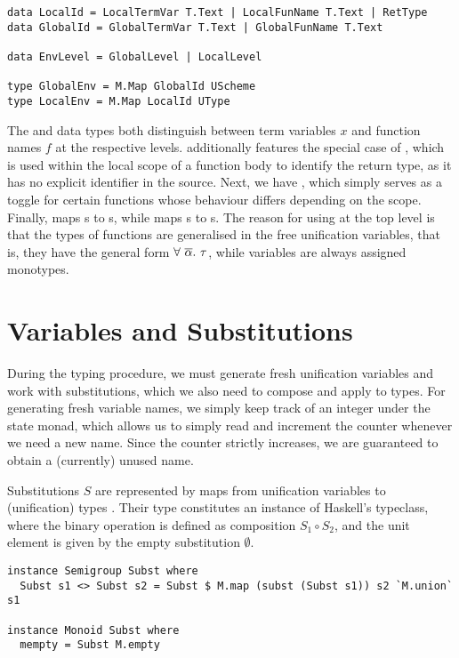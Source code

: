 \begin{verbatim}
data LocalId = LocalTermVar T.Text | LocalFunName T.Text | RetType
data GlobalId = GlobalTermVar T.Text | GlobalFunName T.Text

data EnvLevel = GlobalLevel | LocalLevel

type GlobalEnv = M.Map GlobalId UScheme
type LocalEnv = M.Map LocalId UType
\end{verbatim}

The  and  data types both distinguish between
term variables $x$ and function names $f$ at the respective levels.
 additionally features the special case of ,
which is used within the local scope of a function body to identify the return
type, as it has no explicit identifier in the source.
Next, we have , which simply serves as a toggle for certain
functions whose behaviour differs depending on the scope.
Finally,  maps s to s,
while  maps s to s.
The reason for using  at the top level is that the types of
functions are generalised in the free unification variables, that is, they have
the general form $\forall\ \set{\alpha}.\ \tau$, while variables are always
assigned monotypes.


\section{Variables and Substitutions}

During the typing procedure, we must generate fresh unification variables and
work with substitutions, which we also need to compose and apply to types.
For generating fresh variable names, we simply keep track of an integer
 under the state monad, which allows us to simply read and
increment the counter whenever we need a new name. Since the counter strictly
increases, we are guaranteed to obtain a (currently) unused name.

Substitutions $S$ are represented by maps from unification variables
 to (unification) types . Their type 
constitutes an instance of Haskell's  typeclass, where the
binary operation is defined as composition $S_1 \circ S_2$, and the unit element
is given by the empty substitution $\emptyset$.

\begin{verbatim}
instance Semigroup Subst where
  Subst s1 <> Subst s2 = Subst $ M.map (subst (Subst s1)) s2 `M.union` s1

instance Monoid Subst where
  mempty = Subst M.empty
\end{verbatim}

